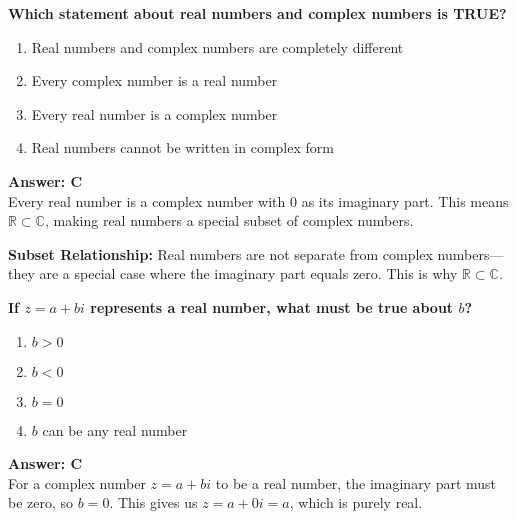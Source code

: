 \documentclass[12pt,a4paper]{article}
\begin{document}
\newpage
\begin{questiontitle}[MCQ 16]
\textbf{Which statement about real numbers and complex numbers is TRUE?}
\end{questiontitle}

\begin{partbox}[Options]
\begin{enumerate}[label=\Alph*.]
    \item Real numbers and complex numbers are completely different
    \item Every complex number is a real number
    \item Every real number is a complex number
    \item Real numbers cannot be written in complex form
\end{enumerate}
\end{partbox}

\begin{answerstyle}
\textbf{Answer: C} \\
Every real number is a complex number with 0 as its imaginary part. This means \( \mathbb{R} \subset \mathbb{C} \), making real numbers a special subset of complex numbers.
\end{answerstyle}

\begin{conceptbox}
\textbf{Subset Relationship:} Real numbers are not separate from complex numbers—they are a special case where the imaginary part equals zero. This is why \( \mathbb{R} \subset \mathbb{C} \).
\end{conceptbox}

\newpage
\begin{questiontitle}[MCQ 17]
\textbf{If \( z = a + bi \) represents a real number, what must be true about \( b \)?}
\end{questiontitle}

\begin{partbox}[Options]
\begin{enumerate}[label=\Alph*.]
    \item \( b > 0 \)
    \item \( b < 0 \)
    \item \( b = 0 \)
    \item \( b \) can be any real number
\end{enumerate}
\end{partbox}

\begin{answerstyle}
\textbf{Answer: C} \\
For a complex number \( z = a + bi \) to be a real number, the imaginary part must be zero, so \( b = 0 \). This gives us \( z = a + 0i = a \), which is purely real.
\end{answerstyle}
\end{document}
